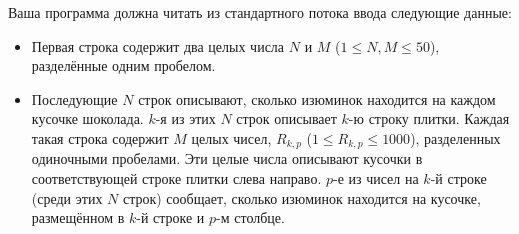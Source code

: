 Ваша программа должна читать из стандартного потока ввода следующие данные:
\begin{itemize}
\item Первая строка содержит два целых числа $N$ и $M$ ($1 \le N, M \le 50$), разделённые одним пробелом.

\item Последующие $N$ строк описывают, сколько изюминок находится на каждом кусочке шоколада. $k$-я из этих $N$ строк описывает $k$-ю строку плитки. Каждая такая строка содержит $M$ целых чисел, $R_{k,p}$ ($1 \le R_{k,p} \le 1000$),  разделенных одиночными пробелами. Эти целые числа описывают кусочки в соответствующей строке плитки слева направо. $p$-е из чисел на $k$-й строке (среди этих $N$ строк) сообщает, сколько изюминок находится на кусочке, размещённом в $k$-й строке и $p$-м столбце.
\end{itemize}